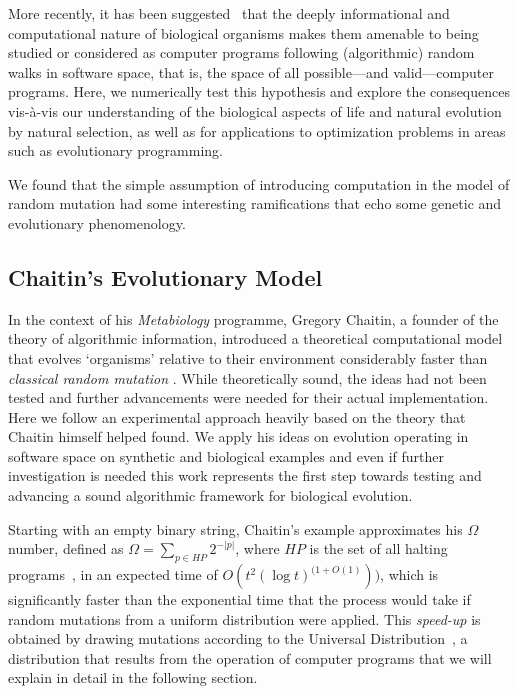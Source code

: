 \documentclass[10pt]{article}
\begin{document}
More recently, it has been suggested~\cite{ChaitinBook,newKindScience,zenil1,zenilubi} that the deeply informational and computational nature of biological organisms makes them amenable to being studied or considered as computer programs following (algorithmic) random walks in software space, that is, the space of all possible---and valid---computer programs. Here, we numerically test this hypothesis and explore the consequences vis-\`a-vis our understanding of the biological aspects of life and natural evolution by natural selection, as well as for applications to optimization problems in areas such as evolutionary programming.

We found that the simple assumption of introducing computation in the model of random mutation had some interesting ramifications that echo some genetic and evolutionary phenomenology.


\subsection{Chaitin's Evolutionary Model}

In the context of his \textit{Metabiology} programme, Gregory Chaitin, a founder of the theory of algorithmic information, introduced a theoretical computational model that evolves `organisms' relative to their environment considerably faster than \textit{classical random mutation} \cite{chaitin:EvolofMutaSoft,ChaitinBook,ChaitinEvolvingSoftware}. While theoretically sound, the ideas had not been tested and further advancements were needed for their actual implementation. Here we follow an experimental approach heavily based on the theory that Chaitin himself helped found. We apply his ideas on evolution operating in software space on synthetic and biological examples and even if further investigation is needed this work represents the first step towards testing and advancing a sound algorithmic framework for biological evolution.

Starting with an empty binary string, Chaitin's example approximates his $\Omega$ number, defined as $\Omega=\scriptstyle \sum_{p\in{}HP} 2^{-|p|}$, where $HP$ is the set of all halting programs~\cite{Turing}, in an expected time of $O(t^2(\log t)^{(1+O(1)}))$, which is significantly faster than the exponential time that the process would take if random mutations from a uniform distribution were applied. This \textit{speed-up} is obtained by drawing mutations according to the Universal Distribution~\cite{Solomonof03,kirchherr1997miraculous}, a distribution that results from the operation of computer programs that we will explain in detail in the following section.
\end{document}
